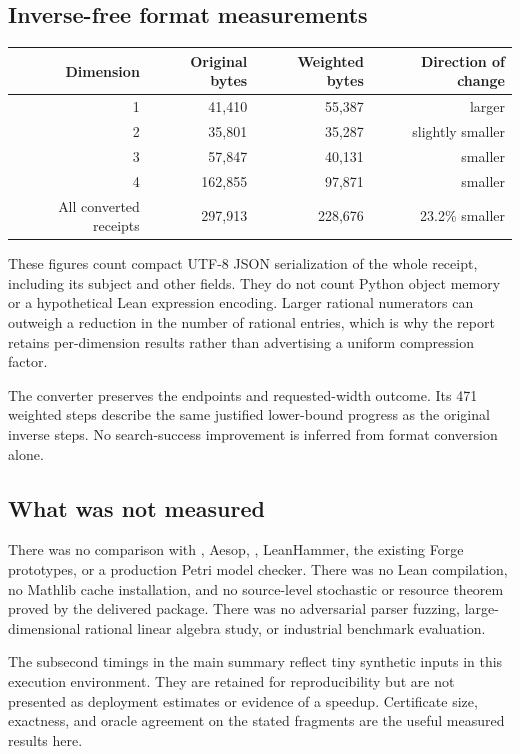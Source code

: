 \subsection{Inverse-free format measurements}
\begin{center}
\begin{tabular}{rrrr}
\toprule
Dimension & Original bytes & Weighted bytes & Direction of change \\
\midrule
1 & 41,410 & 55,387 & larger \\
2 & 35,801 & 35,287 & slightly smaller \\
3 & 57,847 & 40,131 & smaller \\
4 & 162,855 & 97,871 & smaller \\
\midrule
All converted receipts & 297,913 & 228,676 & 23.2\% smaller \\
\bottomrule
\end{tabular}
\end{center}
These figures count compact UTF-8 JSON serialization of the whole receipt, including its subject and other fields. They do not count Python object memory or a hypothetical Lean expression encoding. Larger rational numerators can outweigh a reduction in the number of rational entries, which is why the report retains per-dimension results rather than advertising a uniform compression factor.

The converter preserves the endpoints and requested-width outcome. Its 471 weighted steps describe the same justified lower-bound progress as the original inverse steps. No search-success improvement is inferred from format conversion alone.

\subsection{What was not measured}
There was no comparison with , Aesop, , LeanHammer, the existing Forge prototypes, or a production Petri model checker. There was no Lean compilation, no Mathlib cache installation, and no source-level stochastic or resource theorem proved by the delivered package. There was no adversarial parser fuzzing, large-dimensional rational linear algebra study, or industrial benchmark evaluation.

The subsecond timings in the main summary reflect tiny synthetic inputs in this execution environment. They are retained for reproducibility but are not presented as deployment estimates or evidence of a speedup. Certificate size, exactness, and oracle agreement on the stated fragments are the useful measured results here.
